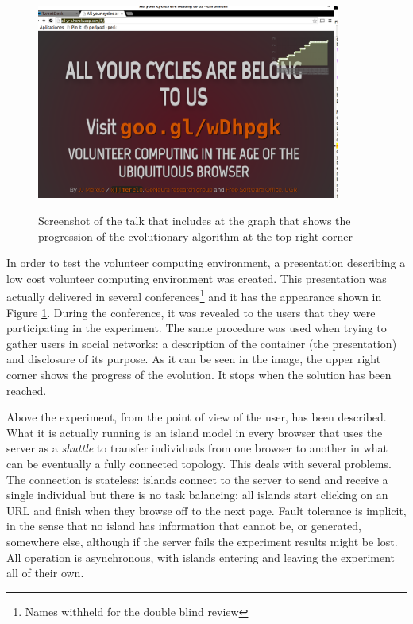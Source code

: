 \documentclass{sig-alternate}
\begin{document}
\begin{figure}[h!tb]
  \centering
  \includegraphics[trim=0cm 2cm 0cm 3cm, width=10cm]{img/screenshot.png}
  \label{fig:sshot}
  \caption{Screenshot of the talk that includes at the graph
    that shows the progression of the evolutionary
    algorithm at the top right corner}
\end{figure}
In order to test the volunteer computing environment, a presentation
describing a low cost volunteer computing environment was
created. This presentation was actually delivered in several
conferences\footnote{Names withheld for the double blind review} and
it has the appearance shown in Figure \ref{fig:sshot}. During the
conference, it was revealed to the users that they were participating
in the experiment. The same procedure was used when trying to gather
users in social networks: a description of the container (the
presentation) and disclosure of its purpose. As it can be seen in the
image, the upper right corner shows the progress of the evolution. It
stops when the solution has been reached. 

Above the experiment, from the point of view of the user, has been
described. What it is actually running is an island model
\cite{muhlenbein1991parallel} in every browser that uses the server as
a {\em shuttle} to transfer individuals from one browser to another in
what can be eventually a fully connected topology. 
This deals with
several problems. The connection is stateless: islands connect to the
server to send and receive a single individual but there is no task
balancing: all islands start clicking on an URL and finish when they
browse off to the next page. Fault tolerance is implicit, in the sense
that no island has information that cannot be, or generated, somewhere
else, although if the server fails the experiment results might be
lost. All operation is asynchronous, with islands entering and leaving
the experiment all of their own. 
\end{document}
